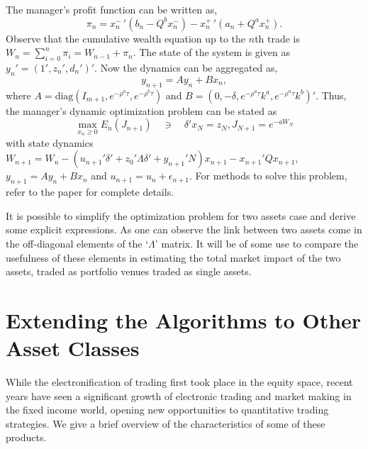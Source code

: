The manager's profit function can be written as,
	\begin{equation}
	\pi_n= x_n^- \,' (b_n - Q^b x_n^-) - x_n^+\,' (a_n + Q^a x_n^+).
	\end{equation}
Observe that the cumulative wealth equation up to the $n$th trade is $W_n= \sum_{i=0}^n \pi_i= W_{n-1} + \pi_n$. The state of the system is given as $y_n'= (1', z_n', d_n')'$. Now the dynamics can be aggregated as,
	\begin{equation}
	y_{n+1} = A y_n + B x_n,
	\end{equation}
where $A= \text{diag}(I_{m+1}, e^{-\rho^a \tau}, e^{-\rho^b \tau})$ and $B= (0, -\delta, e^{-\rho^a\tau} k^a, e^{-\rho^n\tau} k^b)'$. Thus, the manager's dynamic optimization problem can be stated as
	\begin{equation}
	\max_{x_n \geq 0} E_n(J_{n+1}) \quad \ni \quad \delta' x_N= z_N, J_{N+1}= e^{-aW_N}
	\end{equation}
with state dynamics $W_{n+1}= W_n - (u_{n+1}' \delta' + z_0' \Lambda \delta' + y_{n+1}'N) x_{n+1} - x_{n+1}' Q x_{n+1}$, $y_{n+1}= Ay_n + Bx_n$ and $u_{n+1}= u_n + \epsilon_{n+1}$. For methods to solve this problem, refer to the paper for complete details. 


It is possible to simplify the optimization problem for two assets case and derive some explicit expressions. As one can observe the link between two assets come in the off-diagonal elements of the `$\Lambda$' matrix. It will be of some use to compare the usefulness of these elements in estimating the total market impact of the two assets, traded as portfolio venues traded as single assets. 



\section{Extending the Algorithms to Other Asset Classes}

While the electronification of trading first took place in the equity space, recent years have seen a significant growth of electronic trading and market making in the fixed income world, opening new opportunities to quantitative trading strategies. We give a brief overview of the characteristics of some of these products. \twomedskip


